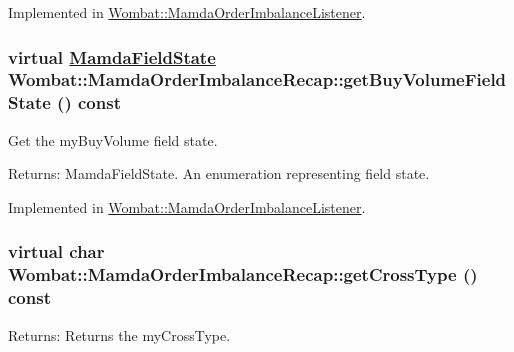 Implemented in \hyperlink{classWombat_1_1MamdaOrderImbalanceListener_7f5cb04154fe3ec2673e616a5958b9f2}{Wombat::Mamda\-Order\-Imbalance\-Listener}.\hypertarget{classWombat_1_1MamdaOrderImbalanceRecap_869bc84756e63963c4b47e0c63ae92c4}{
\subsubsection[getBuyVolumeFieldState]{\setlength{\rightskip}{0pt plus 5cm}virtual \hyperlink{namespaceWombat_93aac974f2ab713554fd12a1fa3b7d2a}{Mamda\-Field\-State} Wombat::Mamda\-Order\-Imbalance\-Recap::get\-Buy\-Volume\-Field\-State () const}}
\label{classWombat_1_1MamdaOrderImbalanceRecap_869bc84756e63963c4b47e0c63ae92c4}


Get the my\-Buy\-Volume field state. 

\begin{Desc}
\item[Returns:]Mamda\-Field\-State. An enumeration representing field state. \end{Desc}


Implemented in \hyperlink{classWombat_1_1MamdaOrderImbalanceListener_979197d028cd40ebe9d689c52377f02c}{Wombat::Mamda\-Order\-Imbalance\-Listener}.\hypertarget{classWombat_1_1MamdaOrderImbalanceRecap_9ecbfc392c96d8fadb6fda3a0b976de1}{
\subsubsection[getCrossType]{\setlength{\rightskip}{0pt plus 5cm}virtual char Wombat::Mamda\-Order\-Imbalance\-Recap::get\-Cross\-Type () const}}
\label{classWombat_1_1MamdaOrderImbalanceRecap_9ecbfc392c96d8fadb6fda3a0b976de1}


\begin{Desc}
\item[Returns:]Returns the my\-Cross\-Type. \end{Desc}


